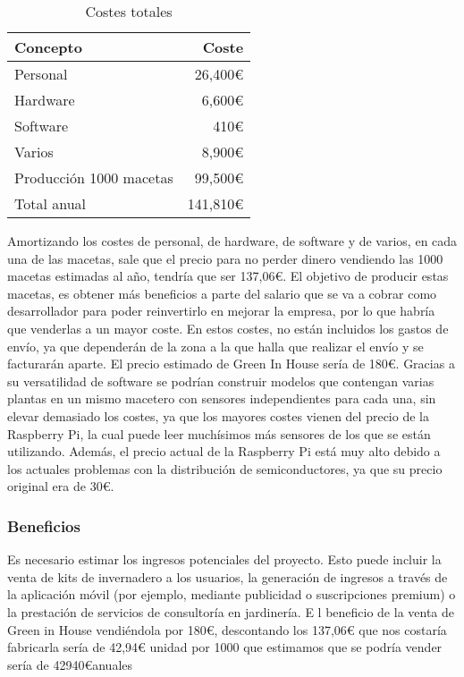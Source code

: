             \begin{table}[H]
                \centering
                \caption{Costes totales}
                \begin{tabular}{|l|r|}
                    \hline
                    Concepto & Coste \\
                    \hline
                    Personal & 26,400€ \\
                    Hardware & 6,600€ \\
                    Software & 410€ \\
                    Varios & 8,900€ \\
                    Producción 1000 macetas & 99,500€ \\
                    \hline
                    Total anual & 141,810€ \\
                    \hline
                \end{tabular}
            \end{table}
            Amortizando los costes de personal, de hardware, de software y de varios, en cada una de las macetas, sale que el precio para no perder dinero vendiendo las 1000 macetas estimadas al año, tendría que ser 137,06€. El objetivo de producir estas macetas, es obtener más beneficios a parte del salario que se va a cobrar como desarrollador para poder reinvertirlo en mejorar la empresa, por lo que habría que venderlas a un mayor coste. En estos costes, no están incluidos los gastos de envío, ya que dependerán de la zona a la que halla que realizar el envío y se facturarán aparte. El precio estimado de Green In House sería de 180€. 
            Gracias a su versatilidad de software se podrían construir modelos que contengan varias plantas en un mismo macetero con sensores independientes para cada una, sin elevar demasiado los costes, ya que los mayores costes vienen del precio de la Raspberry Pi, la cual puede leer muchísimos más sensores de los que se están utilizando. Además, el precio actual de la Raspberry Pi está muy alto debido a los actuales problemas con la distribución de semiconductores, ya que su precio original era de 30€.
        \subsubsection{Beneficios}
        Es necesario estimar los ingresos potenciales del proyecto. Esto puede incluir la venta de kits de invernadero a los usuarios, la generación de ingresos a través de la aplicación móvil (por ejemplo, mediante publicidad o suscripciones premium) o la prestación de servicios de consultoría en jardinería.
        E l beneficio de la venta de  Green in House vendiéndola por 180€, descontando los 137,06€ que nos costaría fabricarla sería de 42,94€ unidad por 1000 que estimamos que se podría vender sería de 42940€anuales
    
